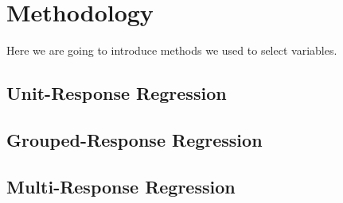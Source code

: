 \section{Methodology}

Here we are going to introduce methods we used to select variables.
\subsection{Unit-Response Regression}

\subsection{Grouped-Response Regression}

\subsection{Multi-Response Regression}
